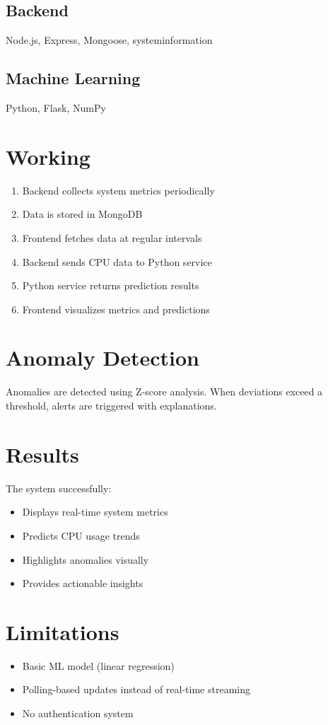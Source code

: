 \documentclass[12pt]{article}
\begin{document}
\subsection{Backend}
Node.js, Express, Mongoose, systeminformation

\subsection{Machine Learning}
Python, Flask, NumPy

\section{Working}
\begin{enumerate}
\item Backend collects system metrics periodically
\item Data is stored in MongoDB
\item Frontend fetches data at regular intervals
\item Backend sends CPU data to Python service
\item Python service returns prediction results
\item Frontend visualizes metrics and predictions
\end{enumerate}

\section{Anomaly Detection}
Anomalies are detected using Z-score analysis. When deviations exceed a threshold, alerts are triggered with explanations.

\section{Results}
The system successfully:
\begin{itemize}
\item Displays real-time system metrics
\item Predicts CPU usage trends
\item Highlights anomalies visually
\item Provides actionable insights
\end{itemize}

\section{Limitations}
\begin{itemize}
\item Basic ML model (linear regression)
\item Polling-based updates instead of real-time streaming
\item No authentication system
\end{itemize}
\end{document}
